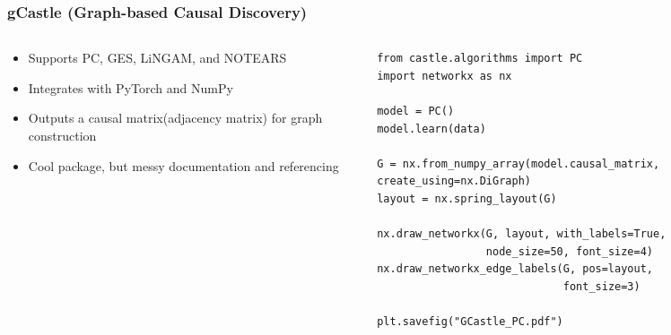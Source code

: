 \documentclass[t,24pt,aspectratio=169]{beamer}
\begin{document}
\begin{frame}[fragile]
\frametitle{gCastle (Graph-based Causal Discovery)}

\begin{columns}
    \begin{column}{0.5\textwidth}
        \begin{itemize}
            \item Supports PC, GES, LiNGAM, and NOTEARS
            \item Integrates with PyTorch and NumPy
            \item Outputs a causal matrix(adjacency matrix) for graph construction
            \item Cool package, but messy documentation and referencing
        \end{itemize}
    \end{column}

    \begin{column}{0.5\textwidth}

        \begin{lstlisting}
from castle.algorithms import PC
import networkx as nx

model = PC()
model.learn(data)

G = nx.from_numpy_array(model.causal_matrix, create_using=nx.DiGraph)
layout = nx.spring_layout(G)

nx.draw_networkx(G, layout, with_labels=True,
                 node_size=50, font_size=4)
nx.draw_networkx_edge_labels(G, pos=layout,
                             font_size=3)

plt.savefig("GCastle_PC.pdf")
        \end{lstlisting}
    \end{column}
\end{columns}

\end{frame}
\end{document}
